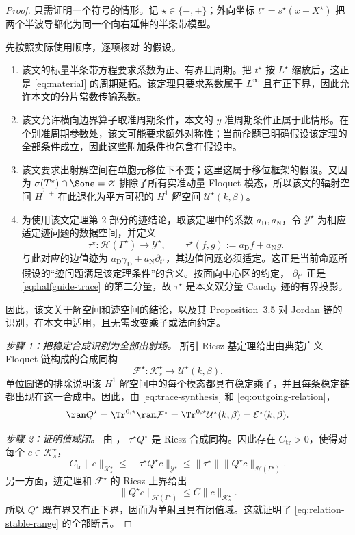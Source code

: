 \begin{proof}
只需证明一个符号的情形。记
$\star\in\{-,+\}$；外向坐标
$t^\star=s^\star(x-X^\star)$ 把两个半波导都化为同一个向右延伸的半条带模型。

先按照实际使用顺序，逐项核对
\cite[Theorem~2.2 and Proposition~3.5]{HohageSoussi2013} 的假设。
\begin{enumerate}[label=\textup{(\arabic*)},leftmargin=*]
  \item 该文的标量半条带方程要求系数为正、有界且周期。把
  $t^\star$ 按 $L^\star$ 缩放后，这正是
  \eqref{eq:material} 的周期延拓。该定理只要求系数属于
  $L^\infty$ 且有正下界，因此允许本文的分片常数传输系数。
  \item 该文允许横向边界算子取准周期条件，本文的 $y$-准周期条件正属于此情形。在个别准周期参数处，该文可能要求额外对称性；当前命题已明确假设该定理的全部条件成立，因此这些附加条件也包含在假设中。
  \item 该文要求出射解空间在单胞元移位下不变；这里这属于移位框架的假设。又因为
  $\sigma(T^\star)\cap\Sone=\varnothing$ 排除了所有实准动量 Floquet 模态，所以该文的辐射空间
  $H^{1,+}$ 在此退化为平方可积的 $H^1$ 解空间
  $\mathcal U^\star(k,\beta)$。
  \item 为使用该文定理第 2 部分的迹结论，取该定理中的系数
  $a_{\mathrm D},a_{\mathrm N}$，令 $\mathcal Y^\star$ 为相应适定迹问题的数据空间，并定义
  \[
    \tau^\star:\mathcal H(\Gamma^\star)\to\mathcal Y^\star,
    \qquad \tau^\star(f,g):=a_{\mathrm D}f+a_{\mathrm N}g.
  \]
  与此对应的边值迹为
  $a_{\mathrm D}\gamma_{\mathrm D}+a_{\mathrm N}\partial_{t^\star}$，其边值问题必须适定。这正是当前命题所假设的“迹问题满足该定理条件”的含义。按面向中心区的约定，
  $\partial_{t^\star}$ 正是 \eqref{eq:halfguide-trace} 的第二分量，故 $\tau^\star$ 是本文双分量 Cauchy 迹的有界投影。
\end{enumerate}
因此，该文关于解空间和迹空间的结论，以及其 Proposition~3.5 对 Jordan 链的识别，在本文中适用，且无需改变乘子或法向约定。

\emph{步骤 1：把稳定合成识别为全部出射场。}
所引 Riesz 基定理给出由典范广义 Floquet 链构成的合成同构
\[
  \mathcal F^\star:\mathcal K_s^\star
  \longrightarrow\mathcal U^\star(k,\beta).
\]
单位圆谱的排除说明该 $H^1$ 解空间中的每个模态都具有稳定乘子，并且每条稳定链都出现在这一合成中。因此，由
\eqref{eq:trace-synthesis} 和 \eqref{eq:outgoing-relation}，
\[
  \ran Q^\star
  =\Tr^{0,\star}\ran\mathcal F^\star
  =\Tr^{0,\star}\mathcal U^\star(k,\beta)
  =\mathcal E^\star(k,\beta).
\]

\emph{步骤 2：证明值域闭。}
由 \cite[Theorem~2.2, part~2]{HohageSoussi2013}，
$\tau^\star Q^\star$ 是 Riesz 合成同构。因此存在
$C_{\mathrm{tr}}>0$，使得对每个 $c\in\mathcal K_s^\star$，
\[
  C_{\mathrm{tr}}\lVert c\rVert_{\mathcal K_s^\star}
  \leq\lVert \tau^\star Q^\star c\rVert_{\mathcal Y^\star}
  \leq\lVert \tau^\star\rVert
  \lVert Q^\star c\rVert_{\mathcal H(\Gamma^\star)}.
\]
另一方面，迹定理和 $\mathcal F^\star$ 的 Riesz 上界给出
\[
  \lVert Q^\star c\rVert_{\mathcal H(\Gamma^\star)}
  \leq C\lVert c\rVert_{\mathcal K_s^\star}.
\]
所以 $Q^\star$ 既有界又有正下界，因而为单射且具有闭值域。这就证明了
\eqref{eq:relation-stable-range} 的全部断言。


\end{proof}
